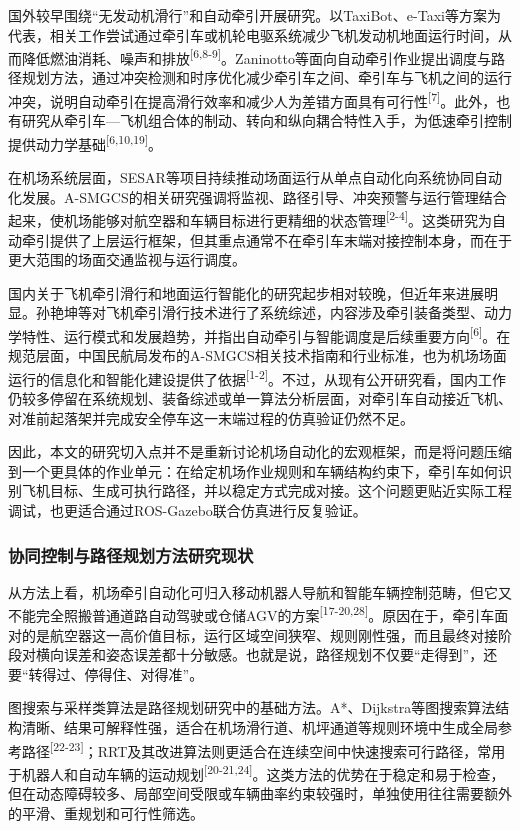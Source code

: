 \documentclass[UTF8,a4paper,12pt]{ctexart}
\begin{document}
国外较早围绕``无发动机滑行''和自动牵引开展研究。以TaxiBot、e-Taxi等方案为代表，相关工作尝试通过牵引车或机轮电驱系统减少飞机发动机地面运行时间，从而降低燃油消耗、噪声和排放\textsuperscript{[6,8-9]}。Zaninotto等面向自动牵引作业提出调度与路径规划方法，通过冲突检测和时序优化减少牵引车之间、牵引车与飞机之间的运行冲突，说明自动牵引在提高滑行效率和减少人为差错方面具有可行性\textsuperscript{[7]}。此外，也有研究从牵引车---飞机组合体的制动、转向和纵向耦合特性入手，为低速牵引控制提供动力学基础\textsuperscript{[6,10,19]}。

在机场系统层面，SESAR等项目持续推动场面运行从单点自动化向系统协同自动化发展。A-SMGCS的相关研究强调将监视、路径引导、冲突预警与运行管理结合起来，使机场能够对航空器和车辆目标进行更精细的状态管理\textsuperscript{[2-4]}。这类研究为自动牵引提供了上层运行框架，但其重点通常不在牵引车末端对接控制本身，而在于更大范围的场面交通监视与运行调度。

国内关于飞机牵引滑行和地面运行智能化的研究起步相对较晚，但近年来进展明显。孙艳坤等对飞机牵引滑行技术进行了系统综述，内容涉及牵引装备类型、动力学特性、运行模式和发展趋势，并指出自动牵引与智能调度是后续重要方向\textsuperscript{[6]}。在规范层面，中国民航局发布的A-SMGCS相关技术指南和行业标准，也为机场场面运行的信息化和智能化建设提供了依据\textsuperscript{[1-2]}。不过，从现有公开研究看，国内工作仍较多停留在系统规划、装备综述或单一算法分析层面，对牵引车自动接近飞机、对准前起落架并完成安全停车这一末端过程的仿真验证仍然不足。

因此，本文的研究切入点并不是重新讨论机场自动化的宏观框架，而是将问题压缩到一个更具体的作业单元：在给定机场作业规则和车辆结构约束下，牵引车如何识别飞机目标、生成可执行路径，并以稳定方式完成对接。这个问题更贴近实际工程调试，也更适合通过ROS-Gazebo联合仿真进行反复验证。

\subsubsection{协同控制与路径规划方法研究现状}\label{_Toc229105292}

从方法上看，机场牵引自动化可归入移动机器人导航和智能车辆控制范畴，但它又不能完全照搬普通道路自动驾驶或仓储AGV的方案\textsuperscript{[17-20,28]}。原因在于，牵引车面对的是航空器这一高价值目标，运行区域空间狭窄、规则刚性强，而且最终对接阶段对横向误差和姿态误差都十分敏感。也就是说，路径规划不仅要``走得到''，还要``转得过、停得住、对得准''。

图搜索与采样类算法是路径规划研究中的基础方法。A*、Dijkstra等图搜索算法结构清晰、结果可解释性强，适合在机场滑行道、机坪通道等规则环境中生成全局参考路径\textsuperscript{[22-23]}；RRT及其改进算法则更适合在连续空间中快速搜索可行路径，常用于机器人和自动车辆的运动规划\textsuperscript{[20-21,24]}。这类方法的优势在于稳定和易于检查，但在动态障碍较多、局部空间受限或车辆曲率约束较强时，单独使用往往需要额外的平滑、重规划和可行性筛选。
\end{document}
